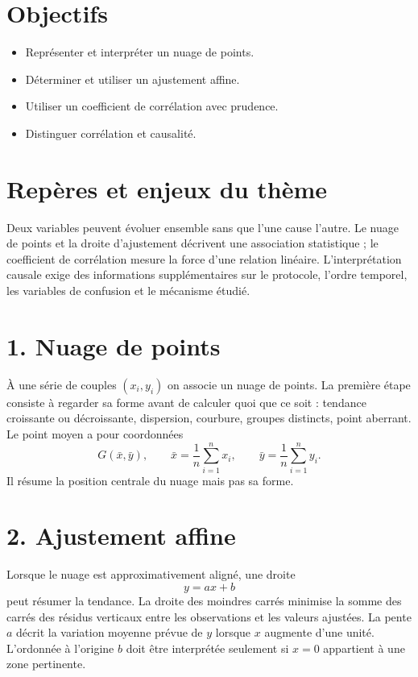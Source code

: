 \section{Objectifs}
\begin{itemize}
\item Représenter et interpréter un nuage de points.
\item Déterminer et utiliser un ajustement affine.
\item Utiliser un coefficient de corrélation avec prudence.
\item Distinguer corrélation et causalité.
\end{itemize}
\section{Repères et enjeux du thème}
Deux variables peuvent évoluer ensemble sans que l'une cause l'autre. Le nuage de points et la droite d'ajustement décrivent une association statistique ; le coefficient de corrélation mesure la force d'une relation linéaire. L'interprétation causale exige des informations supplémentaires sur le protocole, l'ordre temporel, les variables de confusion et le mécanisme étudié.
\section{1. Nuage de points}
À une série de couples $(x_i,y_i)$ on associe un nuage de points. La première étape consiste à regarder sa forme avant de calculer quoi que ce soit : tendance croissante ou décroissante, dispersion, courbure, groupes distincts, point aberrant.
Le point moyen a pour coordonnées
\[
G(\bar x,\bar y),
\qquad
\bar x=\frac1n\sum_{i=1}^n x_i,
\qquad
\bar y=\frac1n\sum_{i=1}^n y_i.
\]
Il résume la position centrale du nuage mais pas sa forme.
\section{2. Ajustement affine}
Lorsque le nuage est approximativement aligné, une droite
\[
y=ax+b
\]
peut résumer la tendance. La droite des moindres carrés minimise la somme des carrés des résidus verticaux entre les observations et les valeurs ajustées.
La pente $a$ décrit la variation moyenne prévue de $y$ lorsque $x$ augmente d'une unité. L'ordonnée à l'origine $b$ doit être interprétée seulement si $x=0$ appartient à une zone pertinente.
